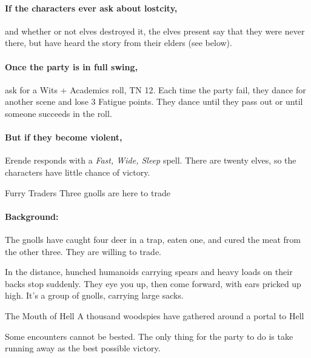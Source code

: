 \begin{multicols}{2}

\paragraph{If the characters ever ask about \gls{lostcity},}
and whether or not elves destroyed it, the elves present say that they were never there, but have heard the story from their elders (see below).

\paragraph{Once the party is in full swing,}
ask for a Wits + Academics roll, TN 12.
Each time the party fail, they dance for another scene and lose 3 Fatigue points.
They dance until they pass out or until someone succeeds in the roll.

\paragraph{But if they become violent,}
Erende responds with a \textit{Fast, Wide, Sleep} spell.
There are twenty elves, so the characters have little chance of victory.

{Furry Traders}%
{Three gnolls are here to trade}%

\paragraph{Background:}
The gnolls have caught four deer in a trap, eaten one, and cured the meat from the other three.  They are willing to trade.

\begin{boxtext}

  In the distance, hunched humanoids carrying spears and heavy loads on their backs stop suddenly.
  They eye you up, then come forward, with ears pricked up high.
  It's a group of gnolls, carrying large sacks.

\end{boxtext}


{\N The Mouth of Hell}%
{A thousand woodspies have gathered around a portal to Hell}%

Some encounters cannot be bested. The only thing for the party to do is take running away as the best possible victory.


\end{multicols}
